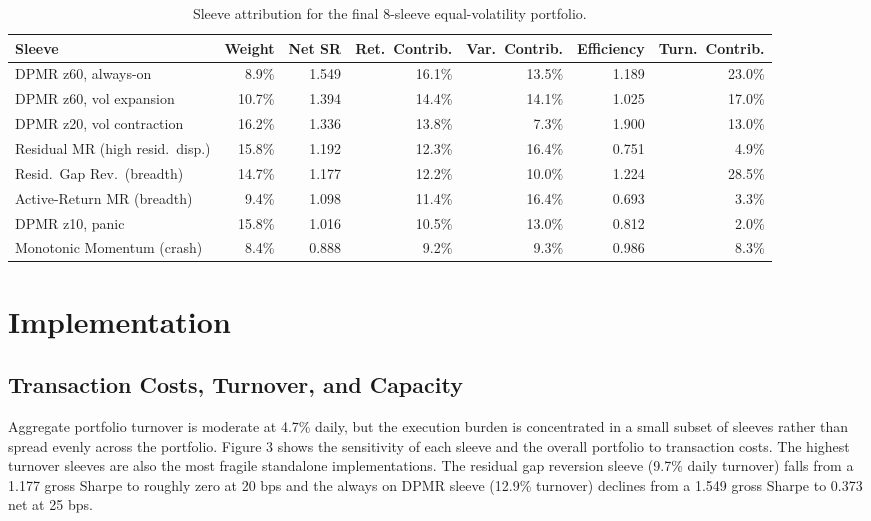 \documentclass{article}
\begin{document}
\begin{table}[htbp]
    \centering
    \small
    \begin{tabular}{lrrrrrr}
        \toprule
        Sleeve & Weight & Net SR & Ret.\ Contrib. & Var.\ Contrib. & Efficiency & Turn.\ Contrib. \\
        \midrule
        DPMR z60, always-on & 8.9\% & 1.549 & 16.1\% & 13.5\% & 1.189 & 23.0\% \\
        DPMR z60, vol expansion & 10.7\% & 1.394 & 14.4\% & 14.1\% & 1.025 & 17.0\% \\
        DPMR z20, vol contraction & 16.2\% & 1.336 & 13.8\% & 7.3\% & 1.900 & 13.0\% \\
        Residual MR (high resid.\ disp.) & 15.8\% & 1.192 & 12.3\% & 16.4\% & 0.751 & 4.9\% \\
        Resid.\ Gap Rev.\ (breadth) & 14.7\% & 1.177 & 12.2\% & 10.0\% & 1.224 & 28.5\% \\
        Active-Return MR (breadth) & 9.4\% & 1.098 & 11.4\% & 16.4\% & 0.693 & 3.3\% \\
        DPMR z10, panic & 15.8\% & 1.016 & 10.5\% & 13.0\% & 0.812 & 2.0\% \\
        Monotonic Momentum (crash) & 8.4\% & 0.888 & 9.2\% & 9.3\% & 0.986 & 8.3\% \\
        \bottomrule
    \end{tabular}
    \caption{Sleeve attribution for the final 8-sleeve equal-volatility portfolio.}
    \label{tab:sleeve-attribution}
\end{table}

\section{Implementation}

\subsection{Transaction Costs, Turnover, and Capacity}

Aggregate portfolio turnover is moderate at 4.7\% daily, but the execution burden is concentrated in a small subset of sleeves rather than spread evenly across the portfolio. Figure 3 shows the sensitivity of each sleeve and the overall portfolio to transaction costs. The highest turnover sleeves are also the most fragile standalone implementations. The residual gap reversion sleeve (9.7\% daily turnover) falls from a 1.177 gross Sharpe to roughly zero at 20 bps and the always on DPMR sleeve (12.9\% turnover) declines from a 1.549 gross Sharpe to 0.373 net at 25 bps.
\end{document}
